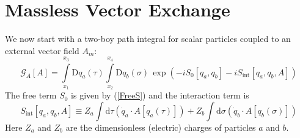 \section{Massless Vector Exchange\label{SecMasslessVec4}}
We now start with a two-boy path integral for scalar particles coupled to an external vector field $A_{m}$:
\begin{equation}
	\mathcal{G}_{A}[A] = \int\limits_{x_{1}}^{x_{3}} \mathrm{D}q_{a}(\tau) \int\limits_{x_{2}}^{x_{4}} \mathrm{D}q_{b}(\sigma) \, \exp{\left(- i S_{0}[q_{a}, q_{b}] - i S_{\text{int}}[q_{a}, q_{b}, A] \right)}
\end{equation}
The free term $S_{0}$ is given by (\ref{FreeS}) and the interaction term is
\begin{equation}
	S_{\text{int}}[q_{a}, q_{b}, A] \equiv Z_{a} \int \mathrm{d}\tau \left( \dot{q}_{a} \cdot A[q_{a}(\tau)] \right) + Z_{b} \int \mathrm{d}\sigma \left( \dot{q}_{b} \cdot A[q_{b}(\sigma)] \right) \label{SintVec}
\end{equation}
Here $Z_{a}$ and $Z_{b}$ are the dimensionless (electric) charges of particles $a$ and $b$.

